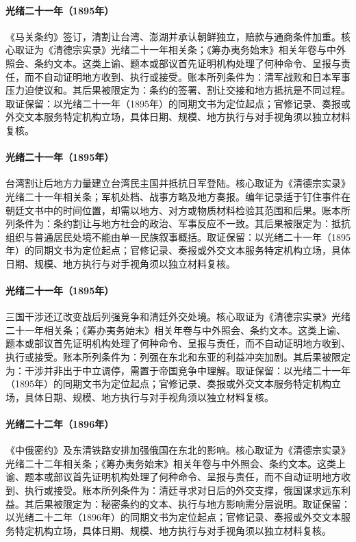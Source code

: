 \hypertarget{ledger:EQ-1895-SHIMONOSEKI-TREATY}{}\paragraph{光绪二十一年（1895年）}《马关条约》签订，清割让台湾、澎湖并承认朝鲜独立，赔款与通商条件加重。核心取证为《清德宗实录》光绪二十一年相关条；《筹办夷务始末》相关年卷与中外照会、条约文本。这类上谕、题本或部议首先证明机构处理了何种命令、呈报与责任，而不自动证明地方收到、执行或接受。账本所列条件为：清军战败和日本军事压力迫使议和。其后果被限定为：条约的签署、割让交接和地方抵抗是不同过程。取证保留：以光绪二十一年（1895年）的同期文书为定位起点；官修记录、奏报或外交文本服务特定机构立场，具体日期、规模、地方执行与对手视角须以独立材料复核。
\hypertarget{ledger:EQ-1895-TAIWAN-REPUBLIC-RESISTANCE}{}\paragraph{光绪二十一年（1895年）}台湾割让后地方力量建立台湾民主国并抵抗日军登陆。核心取证为《清德宗实录》光绪二十一年相关条；军机处档、战事方略及地方奏报。编年记录适于钉住事件在朝廷文书中的时间位置，却需以地方、对方或物质材料检验其范围和后果。账本所列条件为：条约割让与地方社会的政治、军事反应不一致。其后果被限定为：抵抗组织与普通居民处境不能由单一民族叙事概括。取证保留：以光绪二十一年（1895年）的同期文书为定位起点；官修记录、奏报或外交文本服务特定机构立场，具体日期、规模、地方执行与对手视角须以独立材料复核。
\hypertarget{ledger:EQ-1895-TRIPLE-INTERVENTION}{}\paragraph{光绪二十一年（1895年）}三国干涉还辽改变战后列强竞争和清廷外交处境。核心取证为《清德宗实录》光绪二十一年相关条；《筹办夷务始末》相关年卷与中外照会、条约文本。这类上谕、题本或部议首先证明机构处理了何种命令、呈报与责任，而不自动证明地方收到、执行或接受。账本所列条件为：列强在东北和东亚的利益冲突加剧。其后果被限定为：干涉并非出于中立调停，需置于帝国竞争中理解。取证保留：以光绪二十一年（1895年）的同期文书为定位起点；官修记录、奏报或外交文本服务特定机构立场，具体日期、规模、地方执行与对手视角须以独立材料复核。
\hypertarget{ledger:EQ-1896-LI-LOBANOV-TREATY}{}\paragraph{光绪二十二年（1896年）}《中俄密约》及东清铁路安排加强俄国在东北的影响。核心取证为《清德宗实录》光绪二十二年相关条；《筹办夷务始末》相关年卷与中外照会、条约文本。这类上谕、题本或部议首先证明机构处理了何种命令、呈报与责任，而不自动证明地方收到、执行或接受。账本所列条件为：清廷寻求对日后的外交支撑，俄国谋求远东利益。其后果被限定为：秘密条约的文本、执行与地方影响需分层说明。取证保留：以光绪二十二年（1896年）的同期文书为定位起点；官修记录、奏报或外交文本服务特定机构立场，具体日期、规模、地方执行与对手视角须以独立材料复核。
